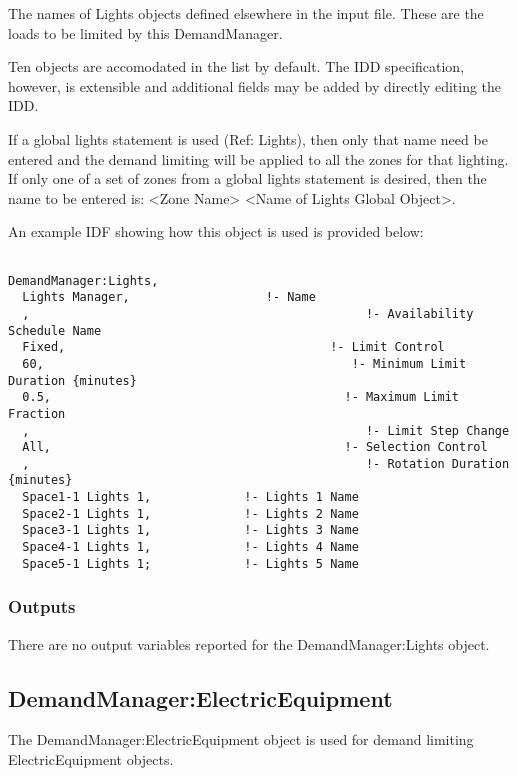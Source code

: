 The names of Lights objects defined elsewhere in the input file. These are the loads to be limited by this DemandManager.

Ten objects are accomodated in the list by default. The IDD specification, however, is extensible and additional fields may be added by directly editing the IDD.

If a global lights statement is used (Ref: Lights), then only that name need be entered and the demand limiting will be applied to all the zones for that lighting. If only one of a set of zones from a global lights statement is desired, then the name to be entered is: \textless{}Zone Name\textgreater{} \textless{}Name of Lights Global Object\textgreater{}.

An example IDF showing how this object is used is provided below:

\begin{lstlisting}

DemandManager:Lights,
  Lights Manager,                   !- Name
  ,                                               !- Availability Schedule Name
  Fixed,                                     !- Limit Control
  60,                                           !- Minimum Limit Duration {minutes}
  0.5,                                         !- Maximum Limit Fraction
  ,                                               !- Limit Step Change
  All,                                         !- Selection Control
  ,                                               !- Rotation Duration {minutes}
  Space1-1 Lights 1,             !- Lights 1 Name
  Space2-1 Lights 1,             !- Lights 2 Name
  Space3-1 Lights 1,             !- Lights 3 Name
  Space4-1 Lights 1,             !- Lights 4 Name
  Space5-1 Lights 1;             !- Lights 5 Name
\end{lstlisting}

\subsubsection{Outputs}\label{outputs-2-005}

There are no output variables reported for the DemandManager:Lights object.

\subsection{DemandManager:ElectricEquipment}\label{demandmanagerelectricequipment}

The DemandManager:ElectricEquipment object is used for demand limiting ElectricEquipment objects.

